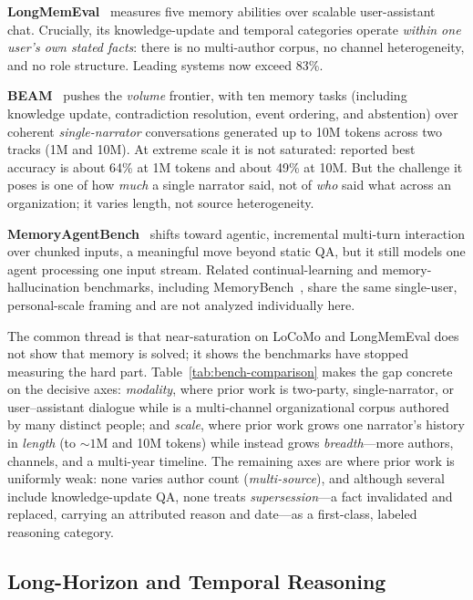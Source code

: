 \textbf{LongMemEval}~\citep{wu2024longmemeval} measures five memory abilities over
scalable user-assistant chat. Crucially, its knowledge-update and temporal
categories operate \emph{within one user's own stated facts}: there is no
multi-author corpus, no channel heterogeneity, and no role structure. Leading
systems now exceed 83\%.

\textbf{BEAM}~\citep{beam2025} pushes the \emph{volume} frontier, with ten memory
tasks (including knowledge update, contradiction resolution, event ordering, and
abstention) over coherent \emph{single-narrator} conversations generated up to 10M
tokens across two tracks (1M and 10M). At extreme scale it is not saturated:
reported best accuracy is about 64\% at 1M tokens and about 49\% at 10M. But the
challenge it poses is one of how \emph{much} a single narrator said, not of
\emph{who} said what across an organization; it varies length, not source
heterogeneity.

\textbf{MemoryAgentBench}~\citep{hu2025memoryagentbench} shifts toward agentic,
incremental multi-turn interaction over chunked inputs, a meaningful move beyond
static QA, but it still models one agent processing one input stream. Related
continual-learning and memory-hallucination benchmarks, including
MemoryBench~\citep{memorybench2025}, share the same single-user, personal-scale
framing and are not analyzed individually here.

The common thread is that near-saturation on LoCoMo and LongMemEval does not show
that memory is solved; it shows the benchmarks have stopped measuring the hard
part. Table~\ref{tab:bench-comparison} makes the gap concrete on the decisive
axes: \emph{modality}, where prior work is two-party, single-narrator, or
user--assistant dialogue while \bench{} is a multi-channel organizational corpus
authored by many distinct people; and \emph{scale}, where prior work grows one
narrator's history in \emph{length} (to ${\sim}1$M and 10M tokens) while \bench{}
instead grows \emph{breadth}---more authors, channels, and a multi-year timeline.
The remaining axes are where prior work is uniformly weak: none varies author
count (\emph{multi-source}), and although several include knowledge-update QA, none
treats \emph{supersession}---a fact invalidated and replaced, carrying an
attributed reason and date---as a first-class, labeled reasoning category.

\subsection{Long-Horizon and Temporal Reasoning}
\label{sec:related:temporal}

